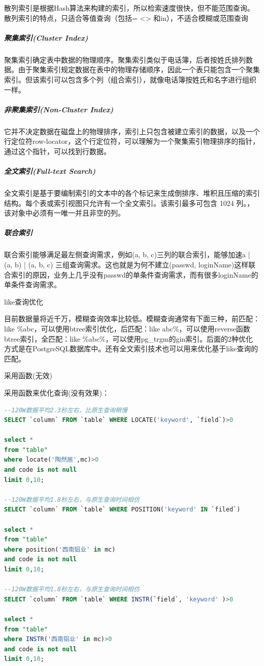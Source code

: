 \documentclass[12pt]{book}
\makeatletter
\numberwithin{dummy}{section}
\theoremstyle{ocrenumbox}
\theoremstyle{blacknumex}
\theoremstyle{blacknumbox}
\theoremstyle{ocrenum}
\renewcommand{\subsection}{\@startsection {subsection}{2}{\z@}
	{-3ex \@plus -0.1ex \@minus -.4ex}
	{0.5ex \@plus.2ex }
	{\normalfont\sffamily\bfseries}}
\renewcommand\paragraph{\@startsection{paragraph}{4}{\z@}
	{-2ex \@plus-.2ex \@minus .2ex}
	{.1ex}
	{\normalfont\small\sffamily\bfseries}}
\makeatother
\begin{document}
散列索引是根据Hash算法来构建的索引，所以检索速度很快，但不能范围查询。散列索引的特点，只适合等值查询（包括= <> 和in），不适合模糊或范围查询

\subparagraph{聚集索引(Cluster Index)}

聚集索引确定表中数据的物理顺序。聚集索引类似于电话簿，后者按姓氏排列数据。由于聚集索引规定数据在表中的物理存储顺序，因此一个表只能包含一个聚集索引。但该索引可以包含多个列（组合索引），就像电话簿按姓氏和名字进行组织一样。 

\subparagraph{非聚集索引(Non-Cluster Index)}

它并不决定数据在磁盘上的物理排序，索引上只包含被建立索引的数据，以及一个行定位符row-locator，这个行定位符，可以理解为一个聚集索引物理排序的指针，通过这个指针，可以找到行数据。

\subparagraph{全文索引(Full-text Search)}

全文索引是基于要编制索引的文本中的各个标记来生成倒排序、堆积且压缩的索引结构。每个表或索引视图只允许有一个全文索引。该索引最多可包含 1024 列。，该对象中必须有一唯一并且非空的列。 

\subparagraph{联合索引}

联合索引能够满足最左侧查询需求，例如(a, b, c)三列的联合索引，能够加速a | (a, b) | (a, b, c) 三组查询需求。这也就是为何不建立(passwd, loginName)这样联合索引的原因，业务上几乎没有passwd的单条件查询需求，而有很多loginName的单条件查询需求。

\subsection{like查询优化}

目前数据量将近千万，模糊查询效率比较低。模糊查询通常有下面三种，前匹配：like \%abc，可以使用btree索引优化，后匹配：like abc\%，可以使用reverse函数btree索引，全匹配：like \%abc\%，可以使用pg\_trgm的gin索引。后面的2种优化方式是在PostgreSQL数据库中。还有全文索引技术也可以用来优化基于like查询的匹配。

\paragraph{采用函数(无效)}

采用函数来优化查询(没有效果)：

\begin{lstlisting}[language=SQL]
--120W数据平均2.3秒左右，比原生查询稍慢
SELECT `column` FROM `table` WHERE LOCATE('keyword', `field`)>0

select * 
from "table" 
where locate('陶然居',mc)>0
and code is not null
limit 0,10;

--120W数据平均1.8秒左右，与原生查询时间相仿
SELECT `column` FROM `table` WHERE POSITION('keyword' IN `filed`)

select * 
from "table" 
where position('西南铝业' in mc)
and code is not null
limit 0,10;

--120W数据平均1.8秒左右，与原生查询时间相仿
SELECT `column` FROM `table` WHERE INSTR(`field`, 'keyword' )>0

select * 
from "table" 
where INSTR('西南铝业' in mc)>0
and code is not null
limit 0,10;
\end{lstlisting}
\end{document}
